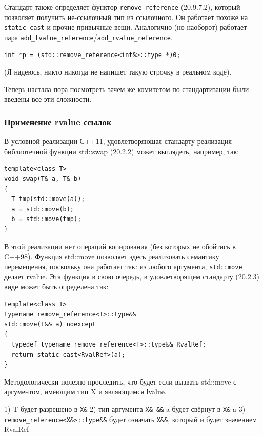 \documentclass[a4paper,12pt,oneside]{article}
\begin{document}
Стандарт также определяет функтор \lstinline!remove_reference! (20.9.7.2), который позволяет получить не-ссылочный тип из ссылочного. Он работает похоже на \lstinline!static_cast! и прочие привычные вещи. Аналогично (но наоборот) работает пара \lstinline!add_lvalue_reference!/\lstinline!add_rvalue_reference!.

\begin{lstlisting}
int *p = (std::remove_reference<int&>::type *)0;
\end{lstlisting}

(Я надеюсь, никто никогда не напишет такую строчку в реальном коде).

Теперь настала пора посмотреть зачем же комитетом по стандартизации были введены все эти сложности.

\subsubsection{Применение rvalue ссылок}

В условной реализации С++11, удовлетворяющая стандарту реализация библиотечной функции std::swap (20.2.2) может выглядеть, например, так:

\begin{lstlisting}
template<class T> 
void swap(T& a, T& b) 
{ 
  T tmp(std::move(a));
  a = std::move(b); 
  b = std::move(tmp);
} 
\end{lstlisting}

В этой реализации нет операций копирования (без которых не обойтись в C++98). Функция std::move позволяет здесь реализовать семантику перемещения, поскольку она работает так: из любого аргумента, \lstinline!std::move! делает rvalue. Эта функция в свою очередь, в удовлетворящем стандарту (20.2.3) виде может быть определена так:

\begin{lstlisting}
template<class T> 
typename remove_reference<T>::type&&
std::move(T&& a) noexcept
{
  typedef typename remove_reference<T>::type&& RvalRef;
  return static_cast<RvalRef>(a);
} 
\end{lstlisting}

Методологически полезно проследить, что будет если вызвать std::move с аргументом, имеющим тип X и являющимся lvalue.

1) T будет разрешено в \lstinline!X&!
2) тип аргумента \lstinline!X& &&! a будет свёрнут в \lstinline!X&! a
3) \lstinline!remove_reference<X&>::type&&! будет означать \lstinline!X&&!, который и будет значением RvalRef
\end{document}
